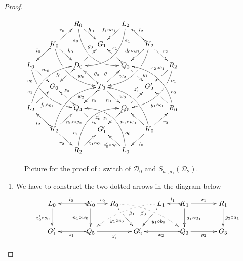 \documentclass[a4paper,UKenglish,cleveref,pdftex,thm-restate,numberwithinsect]{lipics-v2021}
\def\G{\textbf {\textup{G}}}
\newcommand{\dder}[1]{\mathscr{#1}}
\begin{document}
\begin{proof}
	
	\begin{figure}
		\centering
		$\xymatrix@C=15pt@R=15pt{&&R_0 \ar@/_.8cm/[ddrr]_(.2){e_0}|(.7)\hole
			\ar[dr]^{\hspace{-5pt}h_0}&& L_2\ar@/^.8cm/[ddll]^(.2){e_1}
			\ar[dl]_{f_1\circ a_1\hspace{-5pt}}\\&K_0\ar[dr]^{k_0}\ar@{>->}[dl]_{l_0}
			\ar@/_.6cm/[ddrr]|(.36)\hole^(.65){w_0}\ar[ur]^{r_0}&& G_1 &&
			K_2 \ar@/^.6cm/[ddll]|(.36)\hole_(.65){w_2}\ar[dl]_{d_0\circ
				u_2\hspace{-5pt}}\ar@{>->}[lu]_{l_2} \ar[dr]^{r_2}\\L_0
			\ar@/_.6cm/[ddrr]_(.2){o_0}|(.31)\hole|(.81)\hole
			\ar[dr]^(.4){m_0}|(.61)\hole && D_0
			\ar@{>->}[dl]|(.4)\hole_(.65){f_0}\ar[ur]|(.5)\hole^(.7){g_0}&&Q_2
			\ar[dr]|(.4)\hole^(.65){y_1}
			\ar@{>->}[ul]|(.5)\hole_(.65){x_1}&&R_2\ar@/^.6cm/[ddll]^(.2){o_1}|(.31)\hole|(.81)\hole\ar[dl]_(.3){x_2\circ
				b_1}|(.58)\hole \\&G_0 &&P_3\ar[dr]_{n_1}
			\ar@{>->}[dl]^{n_0}\ar[ur]^(.4){\theta_1}\ar@{>->}[ul]_(.4){\theta_0}&&G'_2\\L_2
			\ar@/^.6cm/[uurr]^(.2){e_1} \ar[ur]_(.35){f_0\circ
				e_1}|(.61)\hole&&Q_4
			\ar@{>->}[ul]|(.4)\hole_(.65){z_0}\ar[dr]|(.5)\hole^(.65){z'_0}
			&&Q_5\ar[ur]|(.4)\hole^(.65){z'_1}
			\ar@{>->}[dl]|(.5)\hole_(.65){z_1} && R_0 \ar[ul]^(.3){y_1\circ
				e_0}|(.6)\hole\ar@/_.6cm/[uull]_(.2){e_0}\\&K_2
			\ar[ur]_{\hspace{-2pt}n_0\circ w_2} \ar[dr]_{r_2}
			\ar@{>->}[ul]^{l_2}\ar@/^.6cm/[uurr]_(.65){w_2}&&G'_1&& K_0
			\ar[ur]_{r_0} \ar[ul]^{n_1\circ w_0} \ar[dl]^{l_0}
			\ar@/_.6cm/[uull]^(.65){w_0}\\&& R_2
			\ar[ur]_{\hspace{-4pt}z_1\circ
				o_1}\ar@/^.8cm/[uurr]^(.2){o_1}&& L_0 \ar[ul]^{z'_0\circ
				o_0\hspace{-7pt}} \ar@/_.8cm/[uull]_(.2){o_0} |(.69)\hole
		}	$
		\caption{Picture for the proof of : switch of $\dder{D}_0$ and $S_{a_0,a_1}(\dder{D}_2)$.}
		\label{fi:third}
	\end{figure}
	
	\begin{enumerate}
		\item We have to construct the two dotted arrows in the diagram
		below
		\[\xymatrix@C=15pt{L_0 \ar[d]_{z'_0\circ o_0}&& K_0
			\ar[d]_{n_1\circ w_0}\ar@{>->}[ll]_{l_0} \ar[r]^{r_0} & R_0
			\ar@{.>}@/^.35cm/[drrr]_(.4){\beta_0}|(.29)\hole
			\ar[dr]|(.28)\hole_{y_1\circ e_0} && L_1
			\ar@{.>}@/_.35cm/[dlll]^(.4){\beta_1}
			\ar[dl]|(.28)\hole^{y_1\circ b_0}& K_1 \ar[d]^{d_1\circ
				u_1}\ar@{>->}[l]_{l_1} \ar[rr]^{r_1} && R_1 \ar[d]^{g_2\circ
				a_1}\\G'_1 && \ar@{>->}[ll]^{z_1} Q_5 \ar[rr]_{z'_1}&& G'_2 &&
			\ar@{>->}[ll]^{x_2} Q_3 \ar[rr]_{y_2}&& G_3}\]
		

\end{enumerate}
\end{proof}
\end{document}
